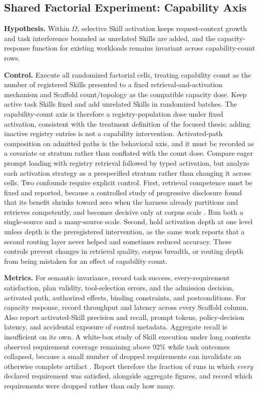 \subsection{Shared Factorial Experiment: Capability Axis}
\label{sec:eval-capability}

\textbf{Hypothesis.} Within $\Omega$, selective Skill activation keeps request-context growth and task interference bounded as unrelated Skills are added, and the capacity-response function for existing workloads remains invariant across capability-count rows.

\textbf{Control.} Execute all randomized factorial cells, treating capability count as the number of registered Skills presented to a fixed retrieval-and-activation mechanism and Scaffold count/topology as the compatible capacity dose. Keep active task Skills fixed and add unrelated Skills in randomized batches. The capability-count axis is therefore a registry-population dose under fixed activation, consistent with the treatment definition of the focused thesis: adding inactive registry entries is not a capability intervention. Activated-path composition on admitted paths is the behavioral axis, and it must be recorded as a covariate or stratum rather than conflated with the count dose. Compare eager prompt loading with registry retrieval followed by typed activation, but analyze each activation strategy as a prespecified stratum rather than changing it across cells. Two confounds require explicit control. First, retrieval competence must be fixed and reported, because a controlled study of progressive disclosure found that its benefit shrinks toward zero when the harness already partitions and retrieves competently, and becomes decisive only at corpus scale \cite{he2026disclosure}. Run both a single-source and a many-source scale. Second, hold activation depth at one level unless depth is the preregistered intervention, as the same work reports that a second routing layer never helped and sometimes reduced accuracy. These controls prevent changes in retrieval quality, corpus breadth, or routing depth from being mistaken for an effect of capability count.

\textbf{Metrics.} For semantic invariance, record task success, every-requirement satisfaction, plan validity, tool-selection errors, and the admission decision, activated path, authorized effects, binding constraints, and postconditions. For capacity response, record throughput and latency across every Scaffold column. Also report activated-Skill precision and recall, prompt tokens, policy-decision latency, and accidental exposure of control metadata. Aggregate recall is insufficient on its own. A white-box study of Skill execution under long contexts observed requirement coverage remaining above 92\% while task outcomes collapsed, because a small number of dropped requirements can invalidate an otherwise complete artifact \cite{xue2026longcontext}. Report therefore the fraction of runs in which \textit{every} declared requirement was satisfied, alongside aggregate figures, and record which requirements were dropped rather than only how many.

